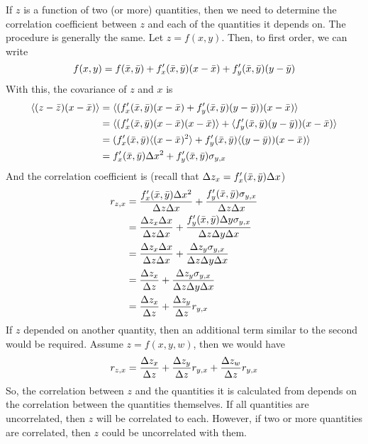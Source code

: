 \documentclass[letterpaper,10pt]{article}
\begin{document}
If $z$ is a function of two (or more) quantities, then we need to determine the correlation coefficient between $z$ and each of the quantities it depends on. The procedure is generally the same.
Let $z = f(x,y)$. Then, to first order, we can write
$$
f(x,y) = f(\bar{x},\bar{y})
      +  f^{\prime}_x(\bar{x},\bar{y}) (x-\bar{x})
      +  f^{\prime}_y(\bar{x},\bar{y}) (y-\bar{y})
$$
With this, the covariance of $z$ and $x$ is 
$$
\begin{aligned}
\langle (z-\bar{z})(x-\bar{x}) \rangle &= \langle  (f^{\prime}_x(\bar{x},\bar{y}) (x-\bar{x}) +  f^{\prime}_y(\bar{x},\bar{y}) (y-\bar{y}))(x - \bar{x})  \rangle \\
                            &= \langle  (f^{\prime}_x(\bar{x},\bar{y}) (x-\bar{x})(x - \bar{x} ) \rangle + \langle  f^{\prime}_y(\bar{x},\bar{y}) (y-\bar{y}))(x - \bar{x})  \rangle \\
                            &= (f^{\prime}_x(\bar{x},\bar{y}) \langle  (x-\bar{x})^2 \rangle +  f^{\prime}_y(\bar{x},\bar{y})\langle  (y-\bar{y}))(x - \bar{x})  \rangle \\
                            &= f^{\prime}_x(\bar{x},\bar{y}) \Delta{x}^2 + f^{\prime}_y(\bar{x},\bar{y})\sigma_{y,x}
\end{aligned}
$$
And the correlation coefficient is (recall that $\Delta{z}_x = f^{\prime}_x(\bar{x},\bar{y}) \Delta{x}$)
$$
\begin{aligned}
r_{z,x} &= \frac{f^{\prime}_x(\bar{x},\bar{y}) \Delta{x}^2}{\Delta{z}\Delta{x}} + \frac{f^{\prime}_y(\bar{x},\bar{y})\sigma_{y,x}}{\Delta{z}\Delta{x}} \\
        &= \frac{\Delta{z}_x\Delta{x}}{\Delta{z}\Delta{x}} + \frac{f^{\prime}_y(\bar{x},\bar{y})\Delta{y}\sigma_{y,x}}{\Delta{z}\Delta{y}\Delta{x}}  \\
        &= \frac{\Delta{z}_x\Delta{x}}{\Delta{z}\Delta{x}} + \frac{\Delta{z}_y\sigma_{y,x}}{\Delta{z}\Delta{y}\Delta{x}}  \\
        &= \frac{\Delta{z}_x}{\Delta{z}} + \frac{\Delta{z}_y\sigma_{y,x}}{\Delta{z}\Delta{y}\Delta{x}}  \\
        &= \frac{\Delta{z}_x}{\Delta{z}} + \frac{\Delta{z}_y}{\Delta{z}}r_{y,x} 
\end{aligned}
$$
If $z$ depended on another quantity, then an additional term similar to the second would be required. Assume $z = f(x,y,w)$, then we would have
$$
r_{z,x} = \frac{\Delta{z}_x}{\Delta{z}} + \frac{\Delta{z}_y}{\Delta{z}}r_{y,x} + \frac{\Delta{z}_w}{\Delta{z}}r_{y,x}
$$
So, the correlation between $z$ and the quantities it is calculated from depends on the correlation between the quantities themselves. If all quantities are uncorrelated, then
$z$ will be correlated to each. However, if two or more quantities are correlated, then $z$ could be uncorrelated with them.
\end{document}
